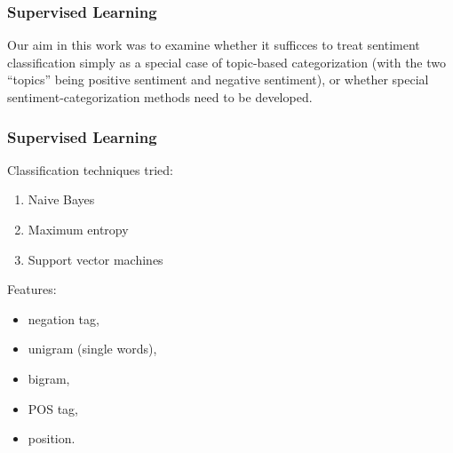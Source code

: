 \documentclass[t]{beamer}
\begin{document}
\begin{frame} \frametitle{Supervised Learning} %


\vfill

\begin{block}{}
Our aim in this work was to examine whether it sufficces to treat
sentiment classification simply as a special case of topic-based 
categorization (with the two ``topics'' being positive sentiment and
negative sentiment), or whether special sentiment-categorization 
methods need to be developed.
\end{block}


\end{frame} 


\begin{frame} \frametitle{Supervised Learning} %


\begin{block}{ Classification techniques tried:}
\begin{enumerate}
\item Naive Bayes 
\item Maximum entropy 
\item Support vector machines
\end{enumerate}
\end{block}


\begin{block}{Features:} 

\begin{itemize}
\item negation tag, 
\item unigram (single words), 
\item bigram, 
\item POS tag, 
\item position.
\end{itemize}

\end{block}

\end{frame}
\end{document}
